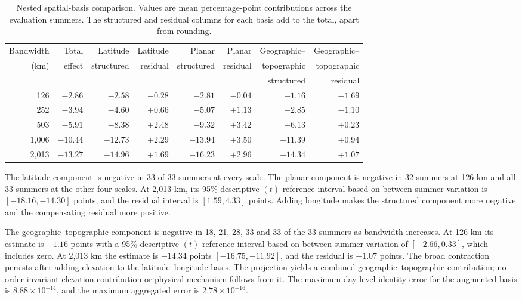 \documentclass[namedate,webpdf,modern,mediumone]{oup-authoring-template}
\theoremstyle{thmstyleone}
\begin{document}
\begin{table}[htbp]
\centering
\caption{Nested spatial-basis comparison. Values are mean percentage-point
contributions across the evaluation summers. The structured and residual
columns for each basis add to the total, apart from rounding.}
\label{tab:basis-decomposition}
\scriptsize
\setlength{\tabcolsep}{4pt}
\begin{tabular}{rrrrrrrr}
\toprule
Bandwidth & Total & Latitude & Latitude & Planar & Planar & Geographic-- & Geographic-- \\
(km) & effect & structured & residual & structured & residual & topographic & topographic \\
 & & & & & & structured & residual \\
\midrule
126   & $-2.86$  & $-2.58$  & $-0.28$ & $-2.81$  & $-0.04$ & $-1.16$  & $-1.69$ \\
252   & $-3.94$  & $-4.60$  & $+0.66$ & $-5.07$  & $+1.13$ & $-2.85$  & $-1.10$ \\
503   & $-5.91$  & $-8.38$  & $+2.48$ & $-9.32$  & $+3.42$ & $-6.13$  & $+0.23$ \\
1,006 & $-10.44$ & $-12.73$ & $+2.29$ & $-13.94$ & $+3.50$ & $-11.39$ & $+0.94$ \\
2,013 & $-13.27$ & $-14.96$ & $+1.69$ & $-16.23$ & $+2.96$ & $-14.34$ & $+1.07$ \\
\bottomrule
\end{tabular}
\end{table}

The latitude component is negative in 33 of 33 summers at every scale. The
planar component is negative in 32 summers at 126 km and all 33 summers at the
other four scales. At 2,013 km, its 95\% descriptive $(t)$-reference interval
based on between-summer variation is $[-18.16,-14.30]$ points, and the residual interval is
$[1.59,4.33]$ points. Adding longitude makes the structured component more
negative and the compensating residual more positive.

The geographic--topographic component is negative in 18, 21, 28, 33 and 33
of the 33 summers as bandwidth increases. At 126 km its estimate is $-1.16$
points with a 95\% descriptive $(t)$-reference interval based on
between-summer variation of $[-2.66,0.33]$, which includes zero. At
2,013 km the estimate is $-14.34$ points
$[-16.75,-11.92]$, and the residual is $+1.07$ points. The broad contraction
persists after adding elevation to the latitude--longitude basis. The
projection yields a combined geographic--topographic contribution; no
order-invariant elevation contribution or physical mechanism follows from it.
The maximum day-level identity error for the augmented basis is
$8.88\times10^{-14}$, and the maximum aggregated error is
$2.78\times10^{-16}$.
\end{document}
